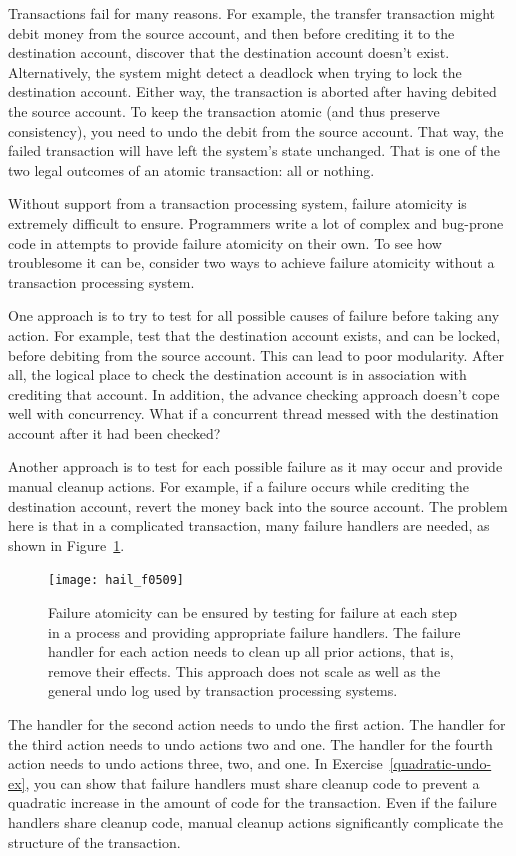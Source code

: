 Transactions fail for many reasons.  For example, the transfer
transaction might debit money from the source account, and then before
crediting it to the destination account, discover that the destination
account doesn't exist.  Alternatively, the system might detect a deadlock when
trying to lock the destination account.  Either way, the transaction
is aborted after having debited the source account.  To keep the
transaction atomic (and thus preserve consistency), you need to undo
the debit from the source account.  That way, the failed transaction
will have left the system's state unchanged.  That is one of the two
legal outcomes of an atomic transaction: all or nothing.

Without support from a transaction processing system, failure
atomicity is extremely difficult to ensure.  Programmers write a lot
of complex and bug-prone code in attempts to provide failure atomicity
on their own.  To see how troublesome it can be, consider two ways to
achieve failure atomicity without a transaction processing system.

One approach is to try to test for all possible causes
of failure before taking any action.  For example, test that the
destination account exists, and can be locked, before debiting from
the source account.  This can lead to poor modularity.  After all, the
logical place to check the destination account is in association with
crediting that account.  In addition, the advance checking approach doesn't
cope well with concurrency.  What if a concurrent thread messed with
the destination account after it had been checked?

Another approach is to test for each possible
failure as it may occur
and provide manual cleanup actions.  For example, if a failure occurs
while crediting the destination account, revert the money back
into the source account.  The problem here is that in a complicated
transaction, many failure handlers are needed, as shown in
Figure~\ref{scan-5-9}.
\begin{figure}
\centerline{\texttt{[image: hail\_f0509]}}
\caption{Failure atomicity can be ensured by testing for failure
  at each step in a process and providing appropriate failure
  handlers.  The failure handler for each action needs to clean up all
  prior actions, that is, remove their effects.  This approach does
  not scale as well as the general undo log used by
  transaction processing systems.}
\label{scan-5-9}
\end{figure}
The handler for the
second action needs to undo the first action.  The handler for the
third action needs to undo actions two and one.  The handler for the
fourth action needs to undo actions three, two, and one.  In
Exercise~\ref{quadratic-undo-ex}, you can show that failure handlers must share cleanup code to prevent a quadratic increase in the
amount of code for the transaction.  Even if the failure handlers
share cleanup code, manual cleanup actions significantly complicate
the structure of the transaction.

